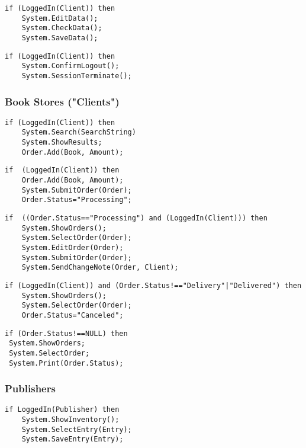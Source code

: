 \documentclass[12pt,a4paper]{article}
\begin{document}
\begin{lstlisting}[caption=/PF04/ Update Account Information]
 if (LoggedIn(Client)) then
 	System.EditData();
 	System.CheckData();
 	System.SaveData();
\end{lstlisting}

\begin{lstlisting}[caption=/PF05/ Logout]
 if (LoggedIn(Client)) then
 	System.ConfirmLogout();
 	System.SessionTerminate();
\end{lstlisting}

\subsubsection{Book Stores ("Clients")}

\begin{lstlisting}[caption=/PF40/ Search for a Book / Show Catalogue]
 if (LoggedIn(Client)) then
 	System.Search(SearchString)
 	System.ShowResults;
 	Order.Add(Book, Amount);
\end{lstlisting}

\begin{lstlisting}[caption=/PF17/ Book Store Order via Web Interface]
if  (LoggedIn(Client)) then
	Order.Add(Book, Amount);
	System.SubmitOrder(Order);
	Order.Status="Processing";
\end{lstlisting}

\begin{lstlisting}[caption=/PF18/ Change Order]
if  ((Order.Status=="Processing") and (LoggedIn(Client))) then
	System.ShowOrders();
	System.SelectOrder(Order);
	System.EditOrder(Order);
	System.SubmitOrder(Order);
	System.SendChangeNote(Order, Client);
\end{lstlisting}

\begin{lstlisting}[caption=/PF19/ Cancel Order]
if (LoggedIn(Client)) and (Order.Status!=="Delivery"|"Delivered") then
	System.ShowOrders();
	System.SelectOrder(Order);
	Order.Status="Canceled";
\end{lstlisting}

\begin{lstlisting}[caption=/PF50/ Tracking System]
 if (Order.Status!==NULL) then
 System.ShowOrders;
 System.SelectOrder;
 System.Print(Order.Status);
\end{lstlisting}

\subsubsection{Publishers}

\begin{lstlisting}[caption=/PF60/ Inventory Maintenance]
 if LoggedIn(Publisher) then
 	System.ShowInventory();
 	System.SelectEntry(Entry);
 	System.SaveEntry(Entry);
\end{lstlisting}
\end{document}
